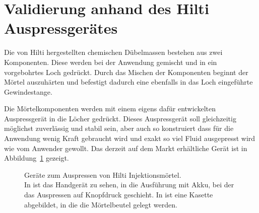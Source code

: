 \section{Validierung anhand des Hilti Auspressgerätes}
\label{Kapitel:Auspressgeraet}
Die von Hilti hergestellten chemischen Dübelmassen bestehen aus zwei Komponenten. Diese werden bei der Anwendung gemischt und in ein vorgebohrtes Loch gedrückt. Durch das Mischen der Komponenten beginnt der Mörtel auszuhärten und befestigt dadurch eine ebenfalls in das Loch eingeführte Gewindestange.

Die Mörtelkomponenten werden mit einem eigens dafür entwickelten Auspressgerät in die Löcher gedrückt. Dieses Auspressgerät soll gleichzeitig möglichst zuverlässig und stabil sein, aber auch so konstruiert dass für die Anwendung wenig Kraft gebraucht wird und exakt so viel Fluid ausgepresst wird wie vom Anwender gewollt.
Das derzeit auf dem Markt erhältliche Gerät ist in Abbildung~\ref{fig:Auspressgeraet} gezeigt.
%
\begin{figure}[b]
    \centering
    \caption{Geräte zum Auspressen von Hilti Injektionsmörtel.\\In {} ist das Handgerät zu sehen, in  die Ausführung mit Akku, bei der das Auspressen auf Knopfdruck geschieht.
    In  ist eine Kasette abgebildet, in die die Mörtelbeutel gelegt werden.}
    \label{fig:Auspressgeraet}
\end{figure}
